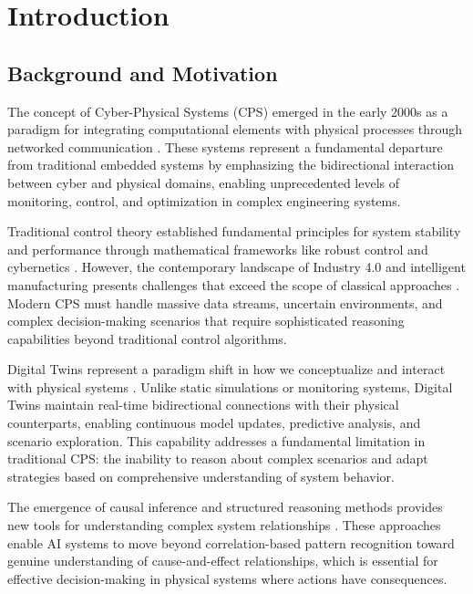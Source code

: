 
\chapter{Introduction} \label{chp:intro}

\section{Background and Motivation}

The concept of Cyber-Physical Systems (CPS) emerged in the early 2000s as a paradigm for integrating computational elements with physical processes through networked communication \cite{lee2008cyber, rajkumar2010cyber, baheti2011cyber, kim2012cyber}. These systems represent a fundamental departure from traditional embedded systems by emphasizing the bidirectional interaction between cyber and physical domains, enabling unprecedented levels of monitoring, control, and optimization in complex engineering systems.

Traditional control theory established fundamental principles for system stability and performance through mathematical frameworks like robust control \cite{doyle1989robust, zhou1996robust} and cybernetics \cite{ashby1956introduction}. However, the contemporary landscape of Industry 4.0 and intelligent manufacturing presents challenges that exceed the scope of classical approaches \cite{lasi2014industry, xu2018industry}. Modern CPS must handle massive data streams, uncertain environments, and complex decision-making scenarios that require sophisticated reasoning capabilities beyond traditional control algorithms.

Digital Twins represent a paradigm shift in how we conceptualize and interact with physical systems \cite{tao2018digital, grieves2014digital}. Unlike static simulations or monitoring systems, Digital Twins maintain real-time bidirectional connections with their physical counterparts, enabling continuous model updates, predictive analysis, and scenario exploration. This capability addresses a fundamental limitation in traditional CPS: the inability to reason about complex scenarios and adapt strategies based on comprehensive understanding of system behavior.

The emergence of causal inference and structured reasoning methods provides new tools for understanding complex system relationships \cite{pearl2019seven, peters2017elements, pearl2000causality, spirtes2000causation}. These approaches enable AI systems to move beyond correlation-based pattern recognition toward genuine understanding of cause-and-effect relationships, which is essential for effective decision-making in physical systems where actions have consequences.

